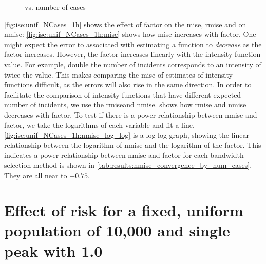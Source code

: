 \begin{figure}[htbp]
\begin{subfigure}[b]{0.24\textwidth}
        \label{fig:ise:unif_NCases_1h:nmise_log_log}
    \end{subfigure}
    \caption[: by number of cases]{ vs. number of cases}
    \label{fig:ise:unif_NCases_1h}
\end{figure}

\autoref{fig:ise:unif_NCases_1h} shows the effect of \gls{factor} on the \gls{mise}, \gls{rmise} and on \gls{nmise}:
\autoref{fig:ise:unif_NCases_1h:mise} shows how \gls{mise} increases with \gls{factor}.
One might expect the error to associated with estimating a function to \textit{decrease} as the \gls{factor} increases.
However, the \gls{factor} increases linearly with the intensity function value.
For example, double the number of incidents corresponds to an intensity of twice the value.
This makes comparing the \gls{mise} of estimates of intensity functions difficult,
as the errors will also rise in the same direction.
In order to facilitate the comparison of intensity functions that have different expected number of incidents,
we use the \gls{rmise}and \gls{nmise}.
 shows how \gls{rmise} and \gls{nmise} decreases with \gls{factor}.
To test if there is a power relationship between \gls{nmise} and \gls{factor},
we take the logarithms of each variable and fit a line.
\autoref{fig:ise:unif_NCases_1h:nmise_log_log} is a log-log graph,
showing the linear relationship between the logarithm of \gls{nmise} and the logarithm of the \gls{factor}.
This indicates a power relationship between \gls{nmise} and \gls{factor} for each bandwidth selection method is shown in \cref{tab:results:nmise_convergence_by_num_cases}.
They are all near to $-0.75$.




\section[Effect of risk spread with fixed population]
    {Effect of risk  for a fixed, uniform population of 10,000 and single peak with  1.0}
\label{sec:results:spread}

